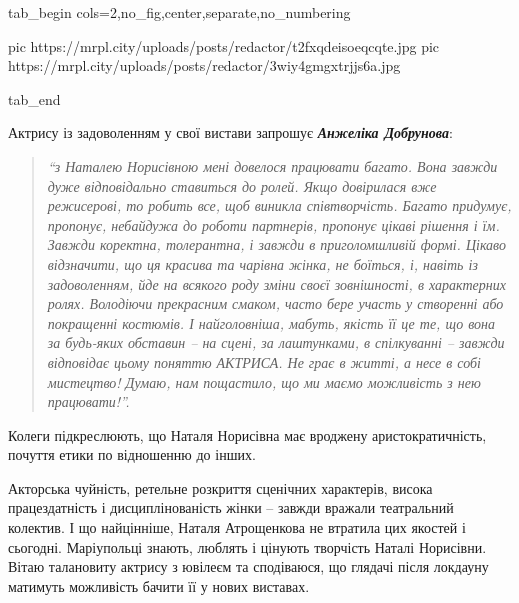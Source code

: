
\ifcmt
  tab_begin cols=2,no_fig,center,separate,no_numbering

  pic https://mrpl.city/uploads/posts/redactor/t2fxqdeisoeqcqte.jpg
  pic https://mrpl.city/uploads/posts/redactor/3wiy4gmgxtrjjs6a.jpg

  tab_end
\fi

Актрису із задоволенням у свої вистави запрошує \emph{\textbf{Анжеліка Добрунова}}: 

\begin{quote}
\em\enquote{з Наталею
Норисівною  мені довелося працювати багато. Вона завжди дуже відповідально
ставиться до ролей. Якщо довірилася вже режисерові, то робить все, щоб виникла
співтворчість. Багато придумує, пропонує, небайдужа до роботи партнерів,
пропонує цікаві рішення і їм. Завжди коректна, толерантна, і завжди в
приголомшливій формі. Цікаво відзначити, що ця красива та чарівна жінка, не
боїться, і, навіть із задоволенням, йде на всякого роду зміни своєї
зовнішності, в характерних ролях. Володіючи прекрасним смаком, часто бере
участь у створенні або покращенні костюмів. І найголовніша, мабуть, якість її
це те, що вона за будь-яких обставин – на сцені, за лаштунками, в спілкуванні –
завжди відповідає цьому поняттю АКТРИСА. Не грає в житті, а несе в собі
мистецтво! Думаю, нам пощастило, що ми маємо можливість з нею працювати!}.
\end{quote}

Колеги підкреслюють, що Наталя Норисівна має вроджену аристократичність,
почуття етики по відношенню до інших.

Акторська чуйність, ретельне розкриття сценічних характерів, висока
працездатність і дисциплінованість жінки – завжди вражали театральний колектив.
І що найцінніше, Наталя Атрощенкова не втратила цих якостей і сьогодні.
Маріупольці знають, люблять і цінують творчість Наталі Норисівни. Вітаю
талановиту актрису з ювілеєм та сподіваюся, що глядачі після локдауну матимуть
можливість бачити її у нових виставах.


